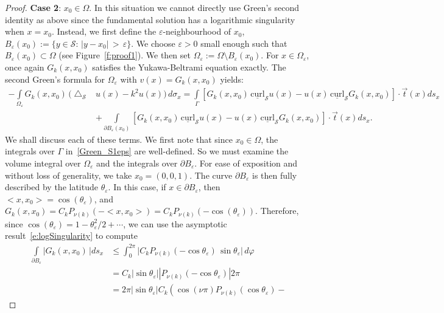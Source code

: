 \documentclass[final]{siamltex}
\newcommand{\lap}{\bigtriangleup}
\newcommand{\C}{C_k}
\renewcommand{\S} {\mathcal{S}}
\begin{document}
\begin{proof}
{\bf Case 2}:  $x_0\in \Omega$.  In this situation  we cannot directly
use Green's second identity as above since the fundamental solution has
a logarithmic singularity when $x=x_0$. Instead, we first define the
$\varepsilon$-neighbourhood of $x_0$,
$B_{\varepsilon}(x_0):=\{y\in{\S}:\, |y-x_0| \,>\, \varepsilon\}$. We
choose $\varepsilon>0$ small enough such that
$B_\varepsilon(x_{0})\subset \Omega$ (see Figure~\ref{f:proof1}). We
then set ${\Omega}_{\varepsilon}:=\Omega\setminus
B_{\varepsilon}(x_0)$. For $x\in \Omega_\varepsilon$, once again
$G_k(x,x_0)$ satisfies the Yukawa-Beltrami equation exactly.   The
second Green's formula for $\Omega_{\varepsilon}$ with
$v(x)=G_k(x,x_0)$ yields:
\begin{align}
  - \int\limits_{\Omega_{\varepsilon}} G_k(x,x_0)\,
    (\lap_{\S}& u(x) -k^2u(x))\,d\sigma_x = 
    \int\limits_\Gamma [ G_k(x,x_0)\,\underline{\mbox{curl}}_{\S} 
    u(x) - u(x)\,\underline{\mbox{curl}}_{\S} G_k(x,x_0)] \cdot 
    \vec{t}(x) ds_x \nonumber \\
  &+\int\limits_{\partial B_{\varepsilon}(x_0)} [
    G_k(x,x_0)\,\underline{\mbox{curl}}_{\S} u(x) -
    u(x)\,\underline{\mbox{curl}}_{\S} G_k(x,x_0)]\cdot 
    \vec{t}(x) ds_{x}.
  \label{Green_S1eps}
\end{align}
We shall discuss each of these terms. We first note that since
$x_{0}\in \Omega$, the integrals over $\Gamma$ in~\eqref{Green_S1eps}
are well-defined. So we must examine the volume integral over
$\Omega_\varepsilon$ and the integrals over $\partial B_\varepsilon$.
For ease of exposition and without loss of generality, we take
$x_{0}=(0,0,1)$.  The curve $\partial B_{\varepsilon}$ is then fully
described by the latitude $\theta_{\varepsilon}$.  In this case, if
$x\in \partial B_\varepsilon$, then $<x,x_{0}> =
\cos(\theta_\varepsilon)$, and  $G_k(x,x_0) = \C
P_{\nu(k)}\left(-<x,x_{0}>\right) = \C
P_{\nu(k)}\left(-\cos(\theta_\varepsilon)\right).$ Therefore, since
$\cos(\theta_\varepsilon) = 1- \theta^2_\varepsilon/2 + \cdots$, we can
use the asymptotic result~\eqref{e:logSingularity} to compute
\begin{align*}
 \int\limits_{\partial B_{\varepsilon}}\vert G_k(x,x_0)\,\vert  ds_x 
  &\leq \int_{0}^{2\pi}\vert \C P_{\nu(k)}(-\cos\theta_{\varepsilon})  
    \, \sin\theta_{\varepsilon}| \, d\varphi \\
  &= \C|\sin\theta_{\varepsilon}|
    |P_{\nu(k)}(-\cos\theta_{\varepsilon}) | 2\pi \\
  &= 2 \pi |\sin\theta_{\varepsilon}|\C \left(\cos(\nu\pi) 
    P_{\nu(k)}(\cos \theta_\varepsilon) - 

\end{align*}
\end{proof}
\end{document}
